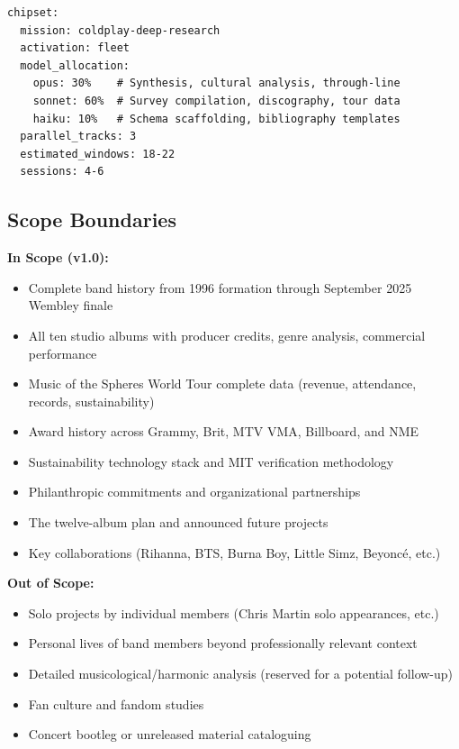 \documentclass[11pt,letterpaper]{article}
\begin{document}
\begin{asciibox}
\begin{verbatim}
chipset:
  mission: coldplay-deep-research
  activation: fleet
  model_allocation:
    opus: 30%    # Synthesis, cultural analysis, through-line
    sonnet: 60%  # Survey compilation, discography, tour data
    haiku: 10%   # Schema scaffolding, bibliography templates
  parallel_tracks: 3
  estimated_windows: 18-22
  sessions: 4-6
\end{verbatim}
\end{asciibox}

\subsection{Scope Boundaries}

\textbf{In Scope (v1.0):}
\begin{itemize}[leftmargin=2em]
  \item Complete band history from 1996 formation through September 2025 Wembley finale
  \item All ten studio albums with producer credits, genre analysis, commercial performance
  \item Music of the Spheres World Tour complete data (revenue, attendance, records, sustainability)
  \item Award history across Grammy, Brit, MTV VMA, Billboard, and NME
  \item Sustainability technology stack and MIT verification methodology
  \item Philanthropic commitments and organizational partnerships
  \item The twelve-album plan and announced future projects
  \item Key collaborations (Rihanna, BTS, Burna Boy, Little Simz, Beyoncé, etc.)
\end{itemize}

\textbf{Out of Scope:}
\begin{itemize}[leftmargin=2em]
  \item Solo projects by individual members (Chris Martin solo appearances, etc.)
  \item Personal lives of band members beyond professionally relevant context
  \item Detailed musicological/harmonic analysis (reserved for a potential follow-up)
  \item Fan culture and fandom studies
  \item Concert bootleg or unreleased material cataloguing
\end{itemize}
\end{document}
